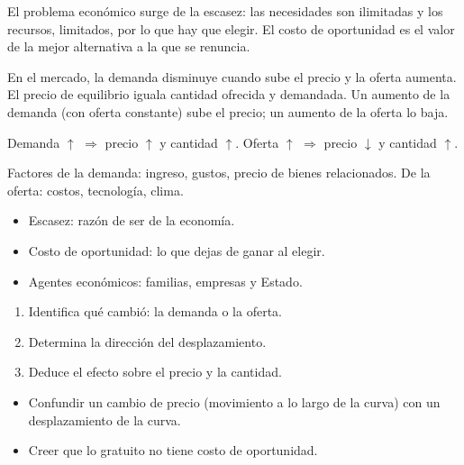 \documentclass[10pt,a4paper,twocolumn]{article}
\begin{document}
El problema económico surge de la escasez: las necesidades son ilimitadas y los recursos, limitados, por lo que hay que elegir. El costo de oportunidad es el valor de la mejor alternativa a la que se renuncia.

En el mercado, la demanda disminuye cuando sube el precio y la oferta aumenta. El precio de equilibrio iguala cantidad ofrecida y demandada. Un aumento de la demanda (con oferta constante) sube el precio; un aumento de la oferta lo baja.

\begin{ley}[Desplazamientos]
Demanda $\uparrow$ $\Rightarrow$ precio $\uparrow$ y cantidad $\uparrow$. Oferta $\uparrow$ $\Rightarrow$ precio $\downarrow$ y cantidad $\uparrow$.

Factores de la demanda: ingreso, gustos, precio de bienes relacionados. De la oferta: costos, tecnología, clima.
\end{ley}

\begin{ideasclave}
\begin{itemize}
  \item Escasez: razón de ser de la economía.
  \item Costo de oportunidad: lo que dejas de ganar al elegir.
  \item Agentes económicos: familias, empresas y Estado.
\end{itemize}
\end{ideasclave}

\begin{metodo}
\begin{enumerate}
  \item Identifica qué cambió: la demanda o la oferta.
  \item Determina la dirección del desplazamiento.
  \item Deduce el efecto sobre el precio y la cantidad.
\end{enumerate}
\end{metodo}

\begin{errorfrecuente}
\begin{itemize}
  \item Confundir un cambio de precio (movimiento a lo largo de la curva) con un desplazamiento de la curva.
  \item Creer que lo gratuito no tiene costo de oportunidad.
\end{itemize}
\end{errorfrecuente}
\end{document}
